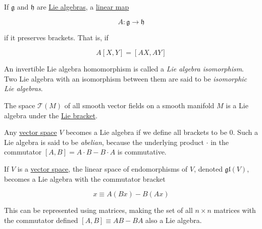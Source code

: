 \documentclass{article}
\newcounter{definition}[section]
\newcounter{example}[section]
\begin{document}
    \begin{definition}
      \label{def:lie-algebra-homomorphism-and-isomorphism}
      If $\mathfrak{g}$ and $\mathfrak{h}$ are \hyperref[def:lie-algebra]{Lie algebras}, a \hyperref[lin-def:linear_map]{linear map} 

        \begin{equation}
          A: \mathfrak{g} \to \mathfrak{h}
        \end{equation}

      if it preserves brackets. That is, if 

        \begin{equation}
          A[X, Y] = [AX, AY]
        \end{equation}

      An invertible Lie algebra homomorphism is called a \textit{Lie algebra isomorphism}. Two Lie algebra with an isomorphism between them are said to be \textit{isomorphic Lie algebras}. 
    \end{definition}

    \begin{example}
      \label{ex:vector-fields-as-a-lie-algebra}
      The space $\mathcal{T}(M)$ of all smooth vector fields on a smooth manifold $M$ is a Lie algebra under the \hyperref[def:lie-bracket]{Lie bracket}. 
    \end{example}

    \begin{example}
      \label{ex:abelian-lie-algebra}
      Any \hyperref[lin-def:vector-space]{vector space} $V$ becomes a Lie algebra if we define all brackets to be $0$. Such a Lie algebra is said to be \textit{abelian}, because the underlying product $\cdot$ in the commutator $[A,B] = A \cdot B - B \cdot A$ is commutative. 
    \end{example}

    \begin{example}
      \label{ex:the-general-linear-lie-algebra-mathfrakglv}
      If $V$ is a \hyperref[lin-def:vector-space]{vector space}, the linear space of endomorphisms of $V$, denoted $\mathfrak{gl}(V)$, becomes a Lie algebra with the commutator bracket

        \begin{equation}
          [A,B] x \equiv A (Bx) - B (Ax)
        \end{equation}

      This can be represented using matrices, making the set of all $n \times n$ matrices with the commutator defined $[A,B] \equiv A B - B A$ also a Lie algebra. 
    \end{example}
\end{document}

